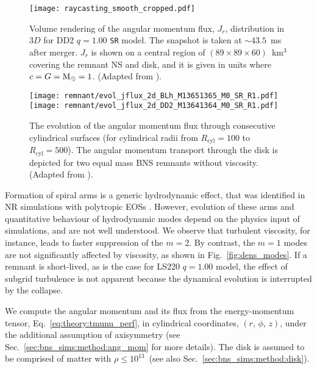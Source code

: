 \begin{figure}[t]
    \centering
    \texttt{[image: raycasting\_smooth\_cropped.pdf]}
    \caption{
        Volume rendering of the angular momentum flux, $J_r$, 
        distribution in $3D$ for DD2 $q=1.00$ \texttt{SR} model. 
        The snapshot is taken at ${\sim}43.5$~ms after
        merger. $J_r$ is shown on a central region of
        $(89\times89\times60)$~km${}^3$ covering the remnant NS
        and disk, and it is given in units where $c=G={\text{M}_{\odot}}=1$.
        (Adapted from \citet{Nedora:2019jhl}).
    }
    \label{fig:ang_mom_flux}
\end{figure}

\begin{figure}[t]
    \centering 
    \texttt{[image: remnant/evol\_jflux\_2d\_BLh\_M13651365\_M0\_SR\_R1.pdf]}
    \texttt{[image: remnant/evol\_jflux\_2d\_DD2\_M13641364\_M0\_SR\_R1.pdf]}
    \caption{
        The evolution of the angular momentum flux through consecutive cylindrical
        surfaces 
        (for cylindrical radii from $R_{\text{cyl}}=100$ to $R_{\text{cyl}}=500$). 
        The angular momentum transport through the disk is depicted 
        for two equal mass \ac{BNS} \pmerg{} remnants without viscosity.
        (Adapted from \citet{Nedora:2020pak}).
    }
    \label{fig:disk_ang_mom_flux_map_blh_q1}
\end{figure}


Formation of spiral arms is a generic hydrodynamic effect, 
that was identified in \ac{NR} simulations with polytropic 
\acp{EOS} \citep{Bernuzzi:2013rza,Radice:2016gym}.
However, evolution of these arms and quantitative behaviour of hydrodynamic
modes depend on the physics input of simulations, and are not well understood. 
We observe that turbulent viscosity, for instance, 
leads to faster suppression of the $m=2$. By contrast, the $m=1$ modes are not
significantly affected by viscosity, as shown in Fig.~\ref{fig:dens_modes}.
%
If a remnant is short-lived, as is the case for LS220 $q=1.00$ model, 
the effect of subgrid turbulence is not apparent because 
the dynamical evolution is interrupted by the collapse.

%
We compute the angular momentum and its flux from the energy-momentum 
tensor, Eq.~\eqref{eq:theory:tmunu_perf},
in cylindrical coordinates, $(r,\, \phi,\, z)$, under the additional
assumption of axisymmetry %
(see Sec.~\ref{sec:bns_sims:method:ang_mom} for more details).
%
The disk is assumed to be comprised of matter with $\rho\leq10^{13}\,$\gcm{} 
(see also Sec.~\ref{sec:bns_sims:method:disk}).

